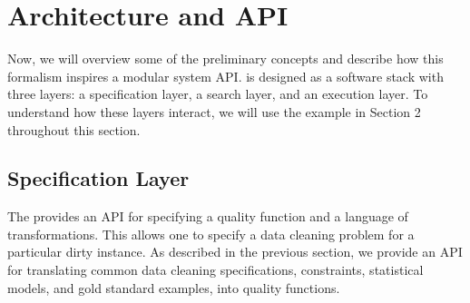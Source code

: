 \section{Architecture and API}
Now, we will overview some of the preliminary concepts and describe how this formalism inspires a modular system API.
\sys is designed as a software stack with three layers: a specification layer, a search layer, and an execution layer.
To understand how these layers interact, we will use the example in Section 2 throughout this section.

\subsection{Specification Layer} The provides an API for specifying a quality function and a language of transformations. This allows one to specify a data cleaning problem for a particular dirty instance. As described in the previous section, we provide an API for translating common data cleaning specifications, constraints, statistical models, and gold standard examples, into quality functions. 

